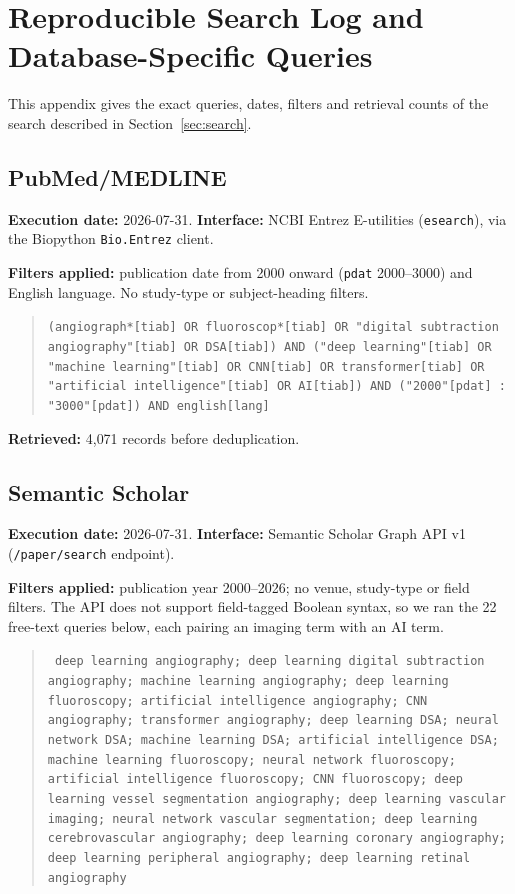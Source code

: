 \section{Reproducible Search Log and Database-Specific Queries}
\label{appendix:search_log}

This appendix gives the exact queries, dates, filters and retrieval counts of the search described in Section~\ref{sec:search}.

\subsection{PubMed/MEDLINE}

\textbf{Execution date:} 2026-07-31. \textbf{Interface:} NCBI Entrez E-utilities (\texttt{esearch}), via the Biopython \texttt{Bio.Entrez} client.

\textbf{Filters applied:} publication date from 2000 onward (\texttt{pdat} 2000--3000) and English language. No study-type or subject-heading filters.

\begin{quote}
\small\texttt{(angiograph*[tiab] OR fluoroscop*[tiab] OR "digital subtraction angiography"[tiab] OR DSA[tiab]) AND ("deep learning"[tiab] OR "machine learning"[tiab] OR CNN[tiab] OR transformer[tiab] OR "artificial intelligence"[tiab] OR AI[tiab]) AND ("2000"[pdat] : "3000"[pdat]) AND english[lang]}
\end{quote}

\textbf{Retrieved:} 4{,}071 records before deduplication.

\subsection{Semantic Scholar}

\textbf{Execution date:} 2026-07-31. \textbf{Interface:} Semantic Scholar Graph API v1 (\texttt{/paper/search} endpoint).

\textbf{Filters applied:} publication year 2000--2026; no venue, study-type or field filters. The API does not support field-tagged Boolean syntax, so we ran the 22 free-text queries below, each pairing an imaging term with an AI term.


\begin{quote}
\raggedright\small\texttt{
deep learning angiography; deep learning digital subtraction angiography; machine learning angiography; deep learning fluoroscopy; artificial intelligence angiography; CNN angiography; transformer angiography; deep learning DSA; neural network DSA; machine learning DSA; artificial intelligence DSA; machine learning fluoroscopy; neural network fluoroscopy; artificial intelligence fluoroscopy; CNN fluoroscopy; deep learning vessel segmentation angiography; deep learning vascular imaging; neural network vascular segmentation; deep learning cerebrovascular angiography; deep learning coronary angiography; deep learning peripheral angiography; deep learning retinal angiography
}
\end{quote}

